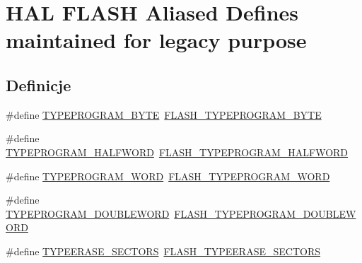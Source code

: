 \hypertarget{group___h_a_l___f_l_a_s_h___aliased___defines}{}\section{H\+AL F\+L\+A\+SH Aliased Defines maintained for legacy purpose}
\label{group___h_a_l___f_l_a_s_h___aliased___defines}
\subsection*{Definicje}
\begin{DoxyCompactItemize}
\item 
\#define \hyperlink{group___h_a_l___f_l_a_s_h___aliased___defines_ga458b1d485bc541d4a9f2196881146026}{T\+Y\+P\+E\+P\+R\+O\+G\+R\+A\+M\+\_\+\+B\+Y\+TE}~\hyperlink{group___f_l_a_s_h___type___program_gac975d7139325057ed0069c6b55e4faed}{F\+L\+A\+S\+H\+\_\+\+T\+Y\+P\+E\+P\+R\+O\+G\+R\+A\+M\+\_\+\+B\+Y\+TE}
\item 
\#define \hyperlink{group___h_a_l___f_l_a_s_h___aliased___defines_ga7f3aba0ba4426991096af46fb513eb4a}{T\+Y\+P\+E\+P\+R\+O\+G\+R\+A\+M\+\_\+\+H\+A\+L\+F\+W\+O\+RD}~\hyperlink{group___f_l_a_s_h___type___program_ga2b607dfc2efd463a8530e327bc755582}{F\+L\+A\+S\+H\+\_\+\+T\+Y\+P\+E\+P\+R\+O\+G\+R\+A\+M\+\_\+\+H\+A\+L\+F\+W\+O\+RD}
\item 
\#define \hyperlink{group___h_a_l___f_l_a_s_h___aliased___defines_ga30d98b2839798f48f8a6e0289ab2677a}{T\+Y\+P\+E\+P\+R\+O\+G\+R\+A\+M\+\_\+\+W\+O\+RD}~\hyperlink{group___f_l_a_s_h___type___program_gadd25c6821539030ba6711e7c0d586c3e}{F\+L\+A\+S\+H\+\_\+\+T\+Y\+P\+E\+P\+R\+O\+G\+R\+A\+M\+\_\+\+W\+O\+RD}
\item 
\#define \hyperlink{group___h_a_l___f_l_a_s_h___aliased___defines_ga12da935a6f8f2870015e55ff8aa9a7b0}{T\+Y\+P\+E\+P\+R\+O\+G\+R\+A\+M\+\_\+\+D\+O\+U\+B\+L\+E\+W\+O\+RD}~\hyperlink{group___f_l_a_s_h___type___program_gabdc2b0b4d2e66c2be90fafbfbf1e225f}{F\+L\+A\+S\+H\+\_\+\+T\+Y\+P\+E\+P\+R\+O\+G\+R\+A\+M\+\_\+\+D\+O\+U\+B\+L\+E\+W\+O\+RD}
\item 
\#define \hyperlink{group___h_a_l___f_l_a_s_h___aliased___defines_ga35d1514adec0ccd2f93cfd47f844d9ee}{T\+Y\+P\+E\+E\+R\+A\+S\+E\+\_\+\+S\+E\+C\+T\+O\+RS}~\hyperlink{group___f_l_a_s_h_ex___type___erase_gaee700cbbc746cf72fca3ebf07ee20c4e}{F\+L\+A\+S\+H\+\_\+\+T\+Y\+P\+E\+E\+R\+A\+S\+E\+\_\+\+S\+E\+C\+T\+O\+RS}
\item 

\end{DoxyCompactItemize}
